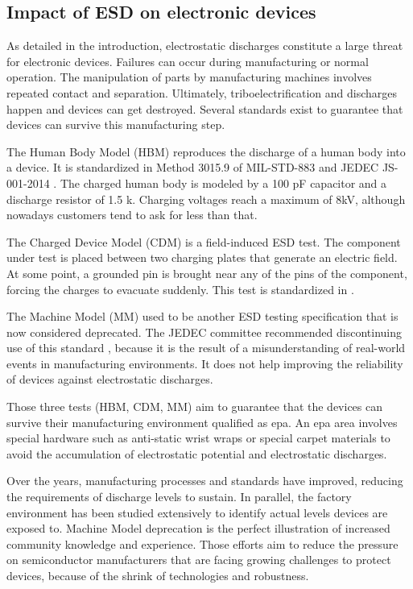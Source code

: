 \subsection{Impact of ESD on electronic devices}

As detailed in the introduction, electrostatic discharges constitute a large threat for electronic devices.
Failures can occur during manufacturing or normal operation.
The manipulation of parts by manufacturing machines involves repeated contact and separation.
Ultimately, triboelectrification and discharges happen and devices can get destroyed.
Several standards exist to guarantee that devices can survive this manufacturing step.

The Human Body Model (HBM) reproduces the discharge of a human body into a device.
It is standardized in Method 3015.9 of MIL-STD-883 \cite{MIL-STD-883} and JEDEC JS-001-2014 \cite{jedec-001}.
The charged human body is modeled by a 100 pF capacitor and a discharge resistor of 1.5 k\textOmega{}.
Charging voltages reach a maximum of 8kV, although nowadays customers tend to ask for less than that.

The Charged Device Model (CDM) is a field-induced ESD test.
The component under test is placed between two charging plates that generate an electric field.
At some point, a grounded pin is brought near any of the pins of the component, forcing the charges to evacuate suddenly.
This test is standardized in \cite{jedec-002}.

The Machine Model (MM) used to be another ESD testing specification that is now considered deprecated.
The JEDEC committee recommended discontinuing use of this standard \cite{discontinued-mm}, because it is the result of a misunderstanding of real-world events in manufacturing environments.
It does not help improving the reliability of devices against electrostatic discharges.

Those three tests (HBM, CDM, MM) aim to guarantee that the devices can survive their manufacturing environment qualified as \gls{epa}.
An \gls{epa} area involves special hardware such as anti-static wrist wraps or special carpet materials to avoid the accumulation of electrostatic potential and electrostatic discharges.

%
Over the years, manufacturing processes and standards have improved, reducing the requirements of discharge levels to sustain.
In parallel, the factory environment has been studied extensively to identify actual levels devices are exposed to.
Machine Model deprecation is the perfect illustration of increased community knowledge and experience.
Those efforts aim to reduce the pressure on semiconductor manufacturers that are facing growing challenges to protect devices, because of the shrink of technologies and robustness.

